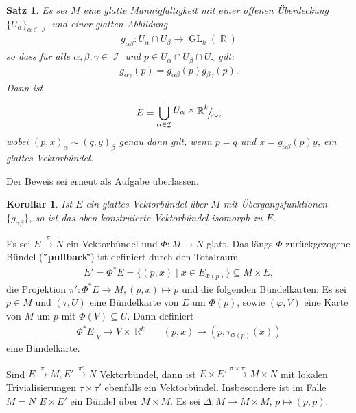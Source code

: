 \documentclass[paper=A4, twoside, chapterprefix=true, bibliography=totoc, headsepline]{scrbook}
\let\temp\phi{}
\let\phi\varphi{}
\let\varphi\temp{}
\let\temp\theta{}
\let\theta\vartheta{}
\let\vartheta\temp{}
\let\temp\epsilon{}
\let\epsilon\varepsilon{}
\let\varepsilon\temp{}
\let\temp\rho{}
\let\rho\varrho{}
\let\varrho\temp{}
\DeclareMathOperator{\R}{\mathbb{R}}
\DeclareMathOperator{\calI}{\mathcal{I}}
\DeclareMathOperator{\Gl}{GL}       %
\newcommand{\X}{\times}
\newcommand{\FakRaum}[2]{
	\raisebox{0.7ex}{\ensuremath{#1}}
	\ensuremath{\mkern-3mu}\big/\ensuremath{\mkern-3mu}
	\raisebox{-0.6ex}{\ensuremath{#2}}}
\theoremstyle{plain}
\newtheorem{Satz}[Dfn]{Satz}
\theoremstyle{nonumberplain}
\newtheorem{kor}{Korollar}
\theoremstyle{empty}
\theoremstyle{break}
\newcommand{\CmIndex}[2][]{\ifthenelse{\isempty{#1}}{\index{#2}}{\index{#1}}#2}
\newcommand{\CmMark}[2][]{\textbf{\CmIndex[#1]{#2}}}
\begin{document}
\begin{Satz}\label{satz-5-2}
  Es sei $M$ eine glatte Mannigfaltigkeit mit einer offenen \"Uberdeckung $\{U_{\alpha}\}_{\alpha \in \calI}$ und einer glatten Abbildung
  \begin{align*}
    g_{\alpha\beta} \colon U_{\alpha} \cap U_{\beta} \to \Gl_k(\R)
  \end{align*}
so dass f\"ur alle $\alpha,\beta,\gamma \in \calI$ und $p \in U_{\alpha} \cap U_{\beta} \cap U_{\gamma}$ gilt:
\begin{align*}
  g_{\alpha\gamma} (p) = g_{\alpha\beta}(p)g_{\beta\gamma}(p).
\end{align*}
Dann ist
	\[ E = \bigcup_{\alpha \in \calI}^{\cdot} \FakRaum{U_{\alpha} \times \R^k}{\sim}, \]
wobei $(p,x)_{\alpha} \sim (q,y)_{\beta}$ genau dann gilt, wenn $p = q$ und $x = g_{\alpha\beta}(p)y$, ein glattes Vektorb\"undel.
\end{Satz}

Der Beweis sei erneut als Aufgabe \"uberlassen.

\begin{kor}
  Ist $E$ ein glattes Vektorb\"undel \"uber $M$ mit \"Ubergangsfunktionen $\{g_{\alpha\beta}\}$, so ist das oben konstruierte Vektorb\"undel isomorph zu $E$.
\end{kor}

Es sei $E \xrightarrow{\pi} N$ ein Vektorb\"undel und $\Phi \colon M \to N$ glatt.
Das l\"angs $\Phi$ zur\"uckgezogene B\"undel (\"`\CmMark{pullback}\"') ist definiert durch den Totalraum
\begin{align*}
  E' = \Phi^{\ast}E = \{(p,x) \mid x \in E_{\Phi(p)}\} \subseteq M \times E,
\end{align*}
die Projektion $\pi' \colon \Phi^{\ast}E \to M, (p,x) \mapsto p$ und die folgenden B\"undelkarten:
Es sei $p \in M$ und $(\tau, U)$ eine B\"undelkarte von $E$ um $\Phi(p)$, sowie $(\phi,V)$ eine Karte von $M$ um $p$ mit $\Phi(V) \subseteq U$.
Dann definiert 
\begin{align*}
  \Phi^{\ast}E|_V \to V \times \R^k && (p,x) \mapsto \left(p, \tau_{\Phi(p)}(x)\right)
\end{align*}
eine B\"undelkarte.

Sind $E \xrightarrow{\pi} M, E' \xrightarrow{\pi'} N$ Vektorb\"undel, dann ist $E \times E' \xrightarrow{\pi \times \pi'} M \times N$ mit lokalen Trivialisierungen $\tau \times \tau'$ ebenfalls ein Vektorb\"undel.
Insbesondere ist im Falle $M = N$ $E \times E'$ ein B\"undel \"uber $M \X M$.
Es sei $\Delta \colon M \to M \times M$, $p \mapsto (p,p)$.
\end{document}
